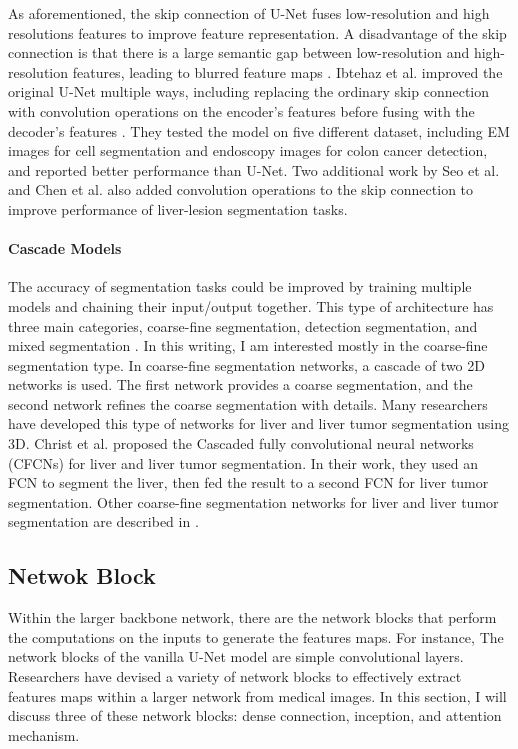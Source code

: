\documentclass [11pt, proquest] {uwthesis}[2020/02/24]
\begin{document}
As aforementioned, the skip connection of U-Net fuses low-resolution and high resolutions 
features to improve feature representation. A disadvantage of the skip connection is that 
there is a large semantic gap between low-resolution and high-resolution features, leading 
to blurred feature maps \cite{ lei_medical_2020}. Ibtehaz et al. improved the original 
U-Net multiple ways, including replacing the ordinary skip connection with convolution 
operations on the encoder’s features before fusing with the decoder’s features 
\cite{ibtehaz_multiresunet_2020}. They tested the model on five different dataset, 
including EM images for cell segmentation and endoscopy images for colon cancer detection, 
and reported better performance than U-Net. Two additional work by Seo et al. \cite{seo_modified_2020} 
and Chen et al. \cite{chen_feature_2019} also added convolution operations to the skip connection 
to improve performance of liver-lesion segmentation tasks.


\paragraph{Cascade Models}

The accuracy of segmentation tasks could be improved by training multiple models and chaining 
their input/output together. This type of architecture has three main categories, coarse-fine 
segmentation, detection segmentation, and mixed segmentation \cite{lei_medical_2020}. In this 
writing, I am interested mostly in the coarse-fine segmentation type. In coarse-fine segmentation 
networks, a cascade of two 2D networks is used. The first network provides a coarse segmentation, 
and the second network refines the coarse segmentation with details. Many researchers have 
developed this type of networks for liver and liver tumor segmentation using 3D. Christ et al. 
proposed the Cascaded fully convolutional neural networks (CFCNs) for liver and liver tumor 
segmentation\cite{christ_automatic_2016}. In their work, they used an FCN to segment the liver, 
then fed the result to a second FCN for liver tumor segmentation. Other coarse-fine segmentation 
networks for liver and liver tumor segmentation are described in \cite{ tang_dsl_2018, 
kaluva_2d-densely_2018, feng_automatic_2018}.

\subsection{Netwok Block}

Within the larger backbone network, there are the network blocks that perform the 
computations on the inputs to generate the features maps. For instance, The network 
blocks of the vanilla U-Net model are simple convolutional layers. Researchers have 
devised a variety of network blocks to effectively extract features maps within a 
larger network from medical images. In this section, I will discuss three of these 
network blocks: dense connection, inception, and attention mechanism.
\end{document}
